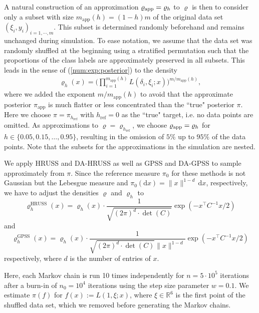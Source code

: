 \documentclass[sn-mathphys-num]{sn-jnl}%
\theoremstyle{thmstyleone}%
\theoremstyle{thmstyletwo}%
\theoremstyle{thmstylethree}%
\newcommand{\rhoapp}{\varrho_{{\rm app}}}
\newcommand{\change}[1]{\bgroup\color{black}#1\egroup}    %
\begin{document}
A natural construction of an approximation $\rhoapp=\varrho_h$ to $\varrho$ is then to consider only a subset with size $m_\text{app}(h)=(1-h)m$ of the original data set $(\xi_i, y_i)_{i=1,\cdots, m}$. This subset is determined randomly beforehand and remains unchanged during simulation. To ease notation, we assume that the data set was randomly shuffled at the beginning \change{using a stratified permutation such that the proportions of the class labels are approximately preserved in all subsets}. This leads in the sense of (\ref{num:exp:posterior}) to the density
\begin{align*}
	\varrho_h(x) 
	=
	  \Big(\prod_{i=1}^{m_\text{app}(h)}
	L(\delta_i, \xi_i; x)\Big)^{m/m_\text{app}(h)},
\end{align*}  
where we added the exponent ${m/m_\text{app}(h)}$ to avoid that the approximate posterior $\pi_\text{app}$ is much flatter or less concentrated than the ``true" posterior $\pi$. 
Here we choose $\pi = \pi_{h_\text{ref}}$ with $h_{\text{ref}}=0$ as the ``true" target, i.e. no data points are omitted. As approximations to $\varrho=\varrho_{h_\text{ref}}$, we choose $\rhoapp=\varrho_h$ for $h \in \{0.05, 0.15, \ldots, 0.95\}$, resulting in the omission of $5\%$ up to $95\%$ of the data points. Note that the subsets for the approximations in the simulation are nested. 

We apply HRUSS and DA-HRUSS as well as GPSS and DA-GPSS to sample approximately from $\pi$. Since the reference measure $\pi_0$ for these methods is not Gaussian but the Lebesgue measure and $\pi_0(\mathrm dx) = \|x\|^{1-d} \, \mathrm dx$, respectively, we have to adjust the densities $\varrho$ and $\varrho_h$ to
\[
    \varrho_h^{\text{HRUSS}}(x)
    =
    \varrho_h(x) \cdot \frac{1}{\sqrt{(2\pi)^d\cdot \det(C)}} \exp(- x^\top C^{-1}x/2)
\]
and
\[
    \varrho_h^{\text{GPSS}}(x)
    =
    \varrho_h(x) \cdot \frac{1}{\sqrt{(2\pi)^d\cdot \det(C)} \lVert x \rVert^{1-d}} \exp(-x^\top C^{-1}x/2)
\]
respectively, where $d$ is the number of entries of $x$.

Here, each Markov chain is run \change{10 times independently} for $n=5\cdot 10^5$ iterations after a burn-in of $n_0=10^4$ iterations using the step size parameter $w=0.1$. We estimate $\pi(f)$ for $f(x) := L(1, \xi; x)$, where $\xi\in\mathbb R^{6}$ is the first point of the shuffled data set, which we removed before generating the Markov chains.
\end{document}
